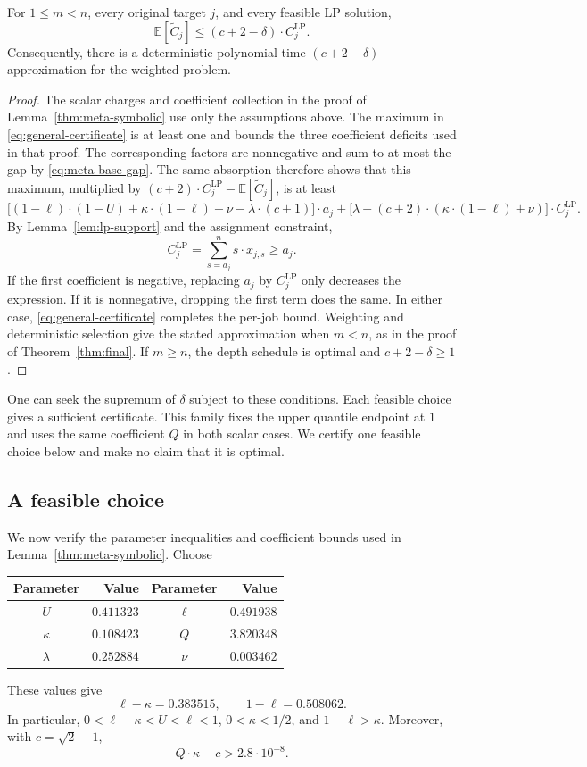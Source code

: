 \begin{proposition}
For $1\le m<n$, every original target $j$, and every feasible LP solution,
\[
 \mathbb E[\widetilde C_j]\le(c+2-\delta)\cdot C_j^{\mathrm{LP}}.
\]
Consequently, there is a deterministic polynomial-time
$(c+2-\delta)$-approximation for the weighted problem.
\end{proposition}
\begin{proof}
The scalar charges and coefficient collection in the proof of
Lemma~\ref{thm:meta-symbolic} use only the assumptions above. The maximum
in \eqref{eq:general-certificate} is at least one and bounds the three
coefficient deficits used in that proof. The corresponding factors are
nonnegative and sum to at most the gap by \eqref{eq:meta-base-gap}. The same absorption therefore
shows that this maximum, multiplied by
$(c+2)\cdot C_j^{\mathrm{LP}}-\mathbb E[\widetilde C_j]$, is at least
\[
 \bigl[(1-\ell)\cdot(1-U)+\kappa\cdot(1-\ell)+\nu-\lambda\cdot(c+1)\bigr]\cdot a_j
 +\bigl[\lambda-(c+2)\cdot(\kappa\cdot(1-\ell)+\nu)\bigr]\cdot C_j^{\mathrm{LP}}.
\]
By Lemma~\ref{lem:lp-support} and the assignment constraint,
\[
 C_j^{\mathrm{LP}}=\sum_{s=a_j}^{n}s\cdot x_{j,s}\ge a_j.
\]
If the first
coefficient is negative, replacing $a_j$ by $C_j^{\mathrm{LP}}$ only
decreases the expression. If it is nonnegative, dropping the first term
does the same. In either case, \eqref{eq:general-certificate} completes
the per-job bound. Weighting and deterministic selection give the stated
approximation when $m<n$, as in the proof of Theorem~\ref{thm:final}.
If $m\ge n$, the depth schedule is optimal and $c+2-\delta\ge1$.
\end{proof}

One can seek the supremum of $\delta$ subject to these conditions. Each
feasible choice gives a sufficient certificate. This family fixes the upper
quantile endpoint at $1$ and uses the same coefficient $Q$ in both scalar cases. We certify one
feasible choice below and make no claim that it is optimal.

\subsection{A feasible choice}

We now verify the parameter inequalities and coefficient bounds used in
Lemma~\ref{thm:meta-symbolic}. Choose
\begin{center}
\begin{tabular}{c|r@{\qquad}c|r}
 Parameter & Value & Parameter & Value\\ \hline
 $U$ & $0.411323$ & $\ell$ & $0.491938$\\
 $\kappa$ & $0.108423$ & $Q$ & $3.820348$\\
 $\lambda$ & $0.252884$ & $\nu$ & $0.003462$
\end{tabular}
\end{center}
These values give
\[
 \ell-\kappa=0.383515,\qquad 1-\ell=0.508062.
\]
In particular, $0<\ell-\kappa<U<\ell<1$, $0<\kappa<1/2$, and
$1-\ell>\kappa$. Moreover, with $c=\sqrt2-1$,
\[
 Q\cdot\kappa-c>2.8\cdot10^{-8}.
\]

